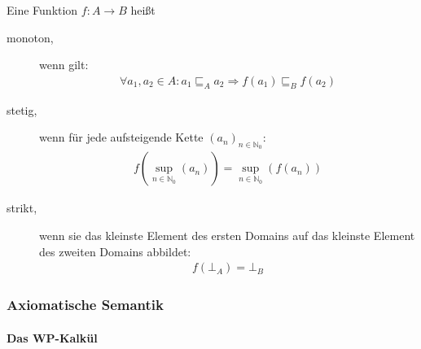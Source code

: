 \documentclass[
  a4paper,
  11pt,
]{scrartcl}
\newcommand{\N}{\mathbb{N}}
\begin{document}
\begin{itemize}
    Eine Funktion $f: A \rightarrow B$ heißt
    \begin{description}
      \item[monoton,] wenn gilt:
        \begin{align*}
          \forall a_1, a_2 \in A:
            a_1 \sqsubseteq_A a_2 \Rightarrow f(a_1) \sqsubseteq_B f(a_2)
        \end{align*}

      \item[stetig,] wenn für jede aufsteigende Kette ${(a_n)}_{n \in \N_0}$:
        \begin{align*}
          f \left( \sup\limits_{n \in \N_0} (a_n) \right)
          =
          \sup\limits_{n \in \N_0} \left( f (a_n) \right)
        \end{align*}

      \item[strikt,] wenn sie das kleinste Element des ersten Domains auf das
        kleinste Element des zweiten Domains abbildet:
        \begin{align*}
          f ( \bot_A ) = \bot_B
        \end{align*}
    \end{description}
\end{itemize}

\subsubsection{Axiomatische Semantik}
\label{ssub:axiomatische_semantik}

\paragraph{Das WP-Kalkül}
\label{par:das_wp_kalkul}
\end{document}
